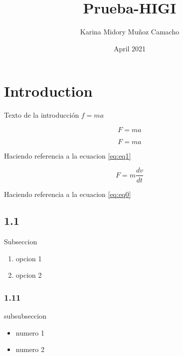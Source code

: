 \documentclass{article}
\title{Prueba-HIGI}
\author{Karina Midory Muñoz Camacho}
\date{April 2021}
\begin{document}
	
	\maketitle
	
	\section{Introduction}
	Texto de la introducción $f = ma$
	
	\[F=ma\]
	
	\begin{equation}
		F=ma
		\label{eq:eq1}
	\end{equation}
	
	Haciendo referencia a la ecuacion \ref{eq:eq1}
	
	\begin{equation}
		F=m\frac{dv}{dt}
		\label{eq:eq0}
	\end{equation}
	
	Haciendo referencia a la ecuacion \ref{eq:eq0}
	
	\subsection{1.1}
	Subseccion
	
	\begin{enumerate}
		\item opcion 1
		\item opcion 2
	\end{enumerate}
	
	\subsubsection{1.11}
	subsubseccion
	
	\begin{itemize}
		\item numero 1
		\item numero 2
	\end{itemize}
	
\end{document}
